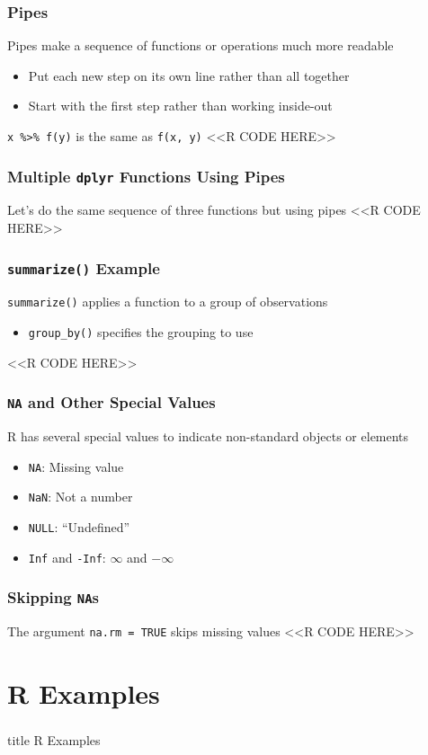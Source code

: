 \documentclass{beamer}
\begin{document}
\begin{frame}[fragile]\frametitle{Pipes}
    Pipes make a sequence of functions or operations much more readable
    \begin{itemize}
        \item Put each new step on its own line rather than all together
        \item Start with the first step rather than working inside-out
    \end{itemize}
    \vspace{2ex}
    \texttt{x \%>\% f(y)} is the same as \texttt{f(x, y)}
    <<R CODE HERE>>
\end{frame}

\begin{frame}[fragile]\frametitle{Multiple \texttt{dplyr} Functions Using Pipes}
    Let's do the same sequence of three functions but using pipes
    <<R CODE HERE>>
\end{frame}

\begin{frame}[fragile]\frametitle{\texttt{summarize()} Example}
    \texttt{summarize()} applies a function to a group of observations
    \begin{itemize}
        \item \texttt{group\_by()} specifies the grouping to use
    \end{itemize}
    <<R CODE HERE>>
\end{frame}

\begin{frame}[fragile]\frametitle{\texttt{NA} and Other Special Values}
    R has several special values to indicate non-standard objects or elements
    \begin{itemize}
        \item \texttt{NA}: Missing value
        \item \texttt{NaN}: Not a number
        \item \texttt{NULL}: ``Undefined''
        \item \texttt{Inf} and \texttt{-Inf}: $\infty$ and $-\infty$
    \end{itemize}
\end{frame}

\begin{frame}[fragile]\frametitle{Skipping \texttt{NA}s}
    The argument \texttt{na.rm = TRUE} skips missing values
    <<R CODE HERE>>
\end{frame}

\section{R Examples}
\label{examples}
\begin{frame}\frametitle{}
    \vfill
    \centering
    \begin{beamercolorbox}[center]{title}
        \Large R Examples
    \end{beamercolorbox}
    \vfill
\end{frame}
\end{document}
